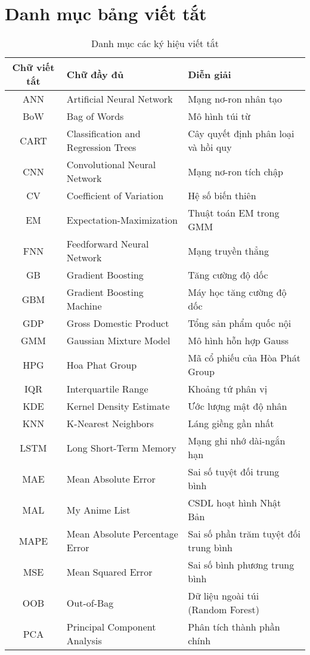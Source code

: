 \chapter*{Danh mục bảng viết tắt}
\begin{table}[ht!]
\centering
\caption{Danh mục các ký hiệu viết tắt}\label{tab:data}
\begin{tabular}{|c|p{5cm}|p{7cm}|}
\hline
\large \textbf{Chữ viết tắt} & \large \textbf{Chữ đầy đủ }&  \large \textbf{Diễn giải} \\ \hline
ANN & Artificial Neural Network & Mạng nơ-ron nhân tạo \\
BoW & Bag of Words & Mô hình túi từ \\
CART & Classification and Regression Trees & Cây quyết định phân loại và hồi quy \\
CNN & Convolutional Neural Network & Mạng nơ-ron tích chập \\
CV & Coefficient of Variation & Hệ số biến thiên \\
EM & Expectation-Maximization & Thuật toán EM trong GMM \\
FNN & Feedforward Neural Network & Mạng truyền thẳng \\
GB & Gradient Boosting & Tăng cường độ dốc \\
GBM & Gradient Boosting Machine & Máy học tăng cường độ dốc \\
GDP & Gross Domestic Product & Tổng sản phẩm quốc nội \\
GMM & Gaussian Mixture Model & Mô hình hỗn hợp Gauss \\
HPG & Hoa Phat Group & Mã cổ phiếu của Hòa Phát Group \\
IQR & Interquartile Range & Khoảng tứ phân vị \\
KDE & Kernel Density Estimate & Ước lượng mật độ nhân \\
KNN & K-Nearest Neighbors & Láng giềng gần nhất \\
LSTM & Long Short-Term Memory & Mạng ghi nhớ dài-ngắn hạn \\
MAE & Mean Absolute Error & Sai số tuyệt đối trung bình \\
MAL & My Anime List & CSDL hoạt hình Nhật Bản \\
MAPE & Mean Absolute Percentage Error & Sai số phần trăm tuyệt đối trung bình \\
MSE & Mean Squared Error & Sai số bình phương trung bình \\
OOB & Out-of-Bag & Dữ liệu ngoài túi (Random Forest) \\
PCA & Principal Component Analysis & Phân tích thành phần chính \\

\end{tabular}
\end{table}
